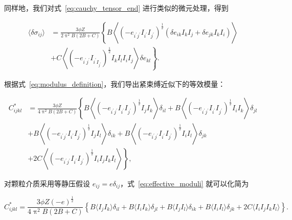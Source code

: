 同样地，我们对式~\eqref{eq:cauchy_tensor_end} 进行类似的微元处理，得到

\begin{equation}
  \begin{aligned}
  \langle\delta\sigma_{ij}\rangle &= \frac{3\phi Z}{2\uppi^{2}B(2B+C)}\left\{B\left\langle\left(-e_{i^{\prime}j^{\prime}}I_{i^{\prime}}I_{j^{\prime}}\right)^{\frac{1}{2}}\left(\delta e_{ik}I_{k}I_{j} + \delta e_{jk}I_{k}I_{i}\right)\right\rangle\right.\\
  &+\left.C\left\langle\left(-e_{i^{\prime}j^{\prime}}I_{i^{\prime}I_{j^{\prime}}}\right)^{\frac{1}{2}}I_{k}I_{l}I_{i}I_{j}\right\rangle\delta e_{kl}\right\}.
  \end{aligned}
\end{equation}

根据式~\eqref{eq:modulus_definition}，我们导出紧束缚近似下的等效模量：

\begin{equation}
  \begin{aligned}
    C_{ijkl}^{*} &= \frac{3\phi Z}{4\uppi^{2}B(2B+C)}\left\{B\left\langle\left(-e_{i^{\prime}j^{\prime}}I_{i^{\prime}}I_{j^{\prime}}\right)^{\frac{1}{2}}I_{j}I_{k}\right\rangle\delta_{il} +  B\left\langle\left(-e_{i^{\prime}j^{\prime}}I_{i^{\prime}}I_{j^{\prime}}\right)^{\frac{1}{2}}I_{i}I_{k}\right\rangle\delta_{jl} \right.\\
    &+B\left\langle\left(-e_{i^{\prime}j^{\prime}}I_{i^{\prime}}I_{j^{\prime}}\right)^{\frac{1}{2}}I_{j}I_{l}\right\rangle\delta_{ik}+ B\left\langle\left(-e_{i^{\prime}j^{\prime}}I_{i^{\prime}}I_{j^{\prime}}\right)^{\frac{1}{2}}I_{i}I_{l}\right\rangle\delta_{jk}\\
    &\left. + 2C\left\langle\left(-e_{i^{\prime}j^{\prime}}I_{i^{\prime}}I_{j^{\prime}}\right)^{\frac{1}{2}}I_{i}I_{j}I_{k}I_{l}\right\rangle\right\},
  \end{aligned}\label{eq:effective_moduli}
\end{equation}

对颗粒介质采用等静压假设 $e_{ij} = e\delta_{ij}$，式~\eqref{eq:effective_moduli} 就可以化简为

\begin{equation}
  C_{ijkl}^{*} = \frac{3\phi Z(-e)^{\frac{1}{2}}}{4\uppi^{2}B(2B+C)}\left\{B\langle I_{j}I_{k}\rangle\delta_{il} + B\langle I_{i}I_{k}\rangle\delta_{jl} + B\langle I_{j}I_{l}\rangle\delta_{ik} + B\langle I_{i}I_{l}\rangle\delta_{jk} + 2C\langle I_{i}I_{j}I_{k}I_{l}\rangle\right\}.
\end{equation}

